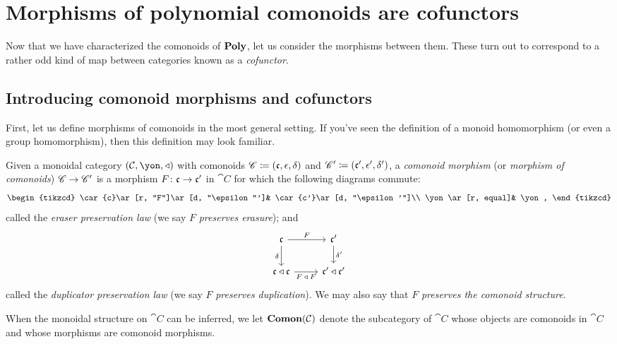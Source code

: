 \documentclass[Book-Poly]{subfiles}
\begin{document}
\section{Morphisms of polynomial comonoids are cofunctors} \label{sec.comon.sharp.cof}

Now that we have characterized the comonoids of $\mathbf{Poly}$, let us consider the morphisms between them.
These turn out to correspond to a rather odd kind of map between categories known as a \emph{cofunctor}.

\subsection{Introducing comonoid morphisms and cofunctors}

First, let us define morphisms of comonoids in the most general setting.
If you've seen the definition of a monoid homomorphism (or even a group homomorphism), then this definition may look familiar.

\begin{definition}\label{def.morphism_comonoids}
Given a monoidal category $(\cat{C},\yon,\tri)$ with comonoids $\mathscr{C}\coloneqq(\mathfrak{c},\epsilon,\delta)$ and $\mathscr{C}'\coloneqq(\mathfrak{c'},\epsilon',\delta')$, a \emph{comonoid morphism} (or \emph{morphism of comonoids}) $\mathscr{C}\to\mathscr{C}'$ is a morphism $F\colon \mathfrak{c}\to\mathfrak{c'}$ in $\cat{C}$ for which the following diagrams commute:
\begin{equation}\label{eqn.pres_era}
\begin{tikzcd}
    \car{c}\ar[r, "F"]\ar[d, "\epsilon"']&
    \car{c'}\ar[d, "\epsilon'"]\\
    \yon\ar[r, equal]&
    \yon,
\end{tikzcd}
\end{equation}
called the \emph{eraser preservation law} (we say $F$ \emph{preserves erasure}); and
\begin{equation}\label{eqn.pres_dup}
\begin{tikzcd}
    \car{c}\ar[r, "F"]\ar[d, "\delta"']&
    \car{c'}\ar[d, "\delta'"]\\
    \car{c}\tri\car{c}\ar[r, "F\:\tri\:F"']&
    \car{c'}\tri\car{c'}
\end{tikzcd}
\end{equation}
called the \emph{duplicator preservation law} (we say $F$ \emph{preserves duplication}).
We may also say that $F$ \emph{preserves the comonoid structure}.

When the monoidal structure on $\cat{C}$ can be inferred, we let $\mathbf{Comon}(\mathcal{C})$ denote the subcategory of $\cat{C}$ whose objects are comonoids in $\cat{C}$ and whose morphisms are comonoid morphisms.
\end{definition}
\end{document}
